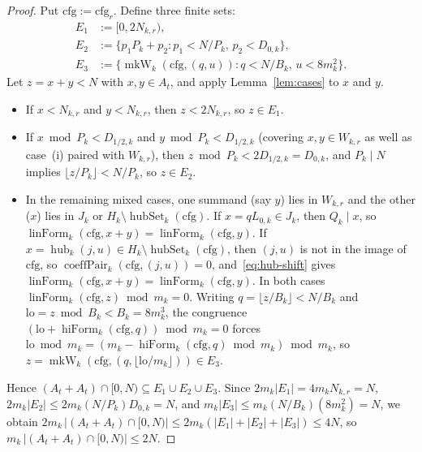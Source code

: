 \documentclass[11pt,a4paper]{amsart}
\newcommand{\linForm}{\operatorname{linForm}}
\newcommand{\hiForm}{\operatorname{hiForm}}
\newcommand{\coeffPair}{\operatorname{coeffPair}}
\newcommand{\hub}{\operatorname{hub}}
\newcommand{\hubSet}{\operatorname{hubSet}}
\newcommand{\mkW}{\operatorname{mkW}}
\begin{document}
\begin{proof}
Put $\mathrm{cfg} := \mathrm{cfg}_r$. Define three finite sets:
\begin{align*}
E_1 &:= [0, 2 N_{k,r}), \\
E_2 &:= \{p_1 P_k + p_2 : p_1 < N / P_k,\, p_2 < D_{0,k}\}, \\
E_3 &:= \{\mkW_k(\mathrm{cfg}, (q, u)) : q < N / B_k,\, u < 8 m_k^2\}.
\end{align*}
Let $z = x + y < N$ with $x, y \in A_t$, and apply Lemma~\ref{lem:cases} to $x$ and $y$.
\begin{itemize}
\item If $x < N_{k,r}$ and $y < N_{k,r}$, then $z < 2 N_{k,r}$, so $z \in E_1$.
\item If $x \bmod P_k < D_{1/2,k}$ and $y \bmod P_k < D_{1/2,k}$ (covering $x, y \in W_{k,r}$ as well as case~(i) paired with $W_{k,r}$), then $z \bmod P_k < 2 D_{1/2,k} = D_{0,k}$, and $P_k \mid N$ implies $\lfloor z / P_k \rfloor < N / P_k$, so $z \in E_2$.
\item In the remaining mixed cases, one summand (say $y$) lies in $W_{k,r}$ and the other ($x$) lies in $J_k$ or $H_k \setminus \hubSet_k(\mathrm{cfg})$. If $x = q L_{0,k} \in J_k$, then $Q_k \mid x$, so $\linForm_k(\mathrm{cfg}, x + y) = \linForm_k(\mathrm{cfg}, y)$. If $x = \hub_k(j, u) \in H_k \setminus \hubSet_k(\mathrm{cfg})$, then $(j, u)$ is not in the image of $\mathrm{cfg}$, so $\coeffPair_k(\mathrm{cfg}, (j, u)) = 0$, and~\eqref{eq:hub-shift} gives $\linForm_k(\mathrm{cfg}, x + y) = \linForm_k(\mathrm{cfg}, y)$. In both cases $\linForm_k(\mathrm{cfg}, z) \bmod m_k = 0$. Writing $q = \lfloor z / B_k \rfloor < N / B_k$ and $\mathrm{lo} = z \bmod B_k < B_k = 8 m_k^3$, the congruence $(\mathrm{lo} + \hiForm_k(\mathrm{cfg}, q)) \bmod m_k = 0$ forces $\mathrm{lo} \bmod m_k = (m_k - \hiForm_k(\mathrm{cfg}, q) \bmod m_k) \bmod m_k$, so $z = \mkW_k(\mathrm{cfg}, (q, \lfloor \mathrm{lo} / m_k \rfloor)) \in E_3$.
\end{itemize}
Hence $(A_t + A_t) \cap [0, N) \subseteq E_1 \cup E_2 \cup E_3$. Since $2 m_k |E_1| = 4 m_k N_{k,r} = N$, $2 m_k |E_2| \le 2 m_k (N / P_k) D_{0,k} = N$, and $m_k |E_3| \le m_k (N / B_k)(8 m_k^2) = N$, we obtain $2 m_k \, |(A_t + A_t) \cap [0, N)| \le 2 m_k(|E_1| + |E_2| + |E_3|) \le 4 N$, so $m_k \, |(A_t + A_t) \cap [0, N)| \le 2 N$.
\end{proof}
\end{document}
